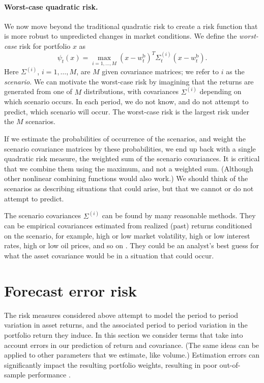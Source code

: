 \documentclass[openany]{now}
\newcommand{\wb}{w^\mathrm{b}}
\begin{document}
\paragraph{Worst-case quadratic risk.}
We now move beyond the traditional quadratic risk to create a
risk function that is more robust to unpredicted
changes in market conditions. We define the
\emph{worst-case} risk for portfolio $x$ as
\[
\psi_t(x) = \max_{i = 1, \ldots, M} (x-\wb_t)^T\Sigma^{(i)}_t (x-\wb_t).
\]
Here $\Sigma^{(i)}$, $i=1,\ldots, M$,
are $M$ given covariance matrices;
we refer to $i$ as the \emph{scenario}.
We can motivate the worst-case risk
by imagining that the returns are generated from one of $M$ distributions,
with covariances $\Sigma^{(i)}$ depending on which scenario occurs.
In each period, we do not know, and do not attempt to predict, which scenario
will occur.
The worst-case risk is the largest risk under the $M$ scenarios.

If we estimate the probabilities of occurrence of
the scenarios, and weight the scenario covariance matrices by these probabilities,
we end up back with a single quadratic risk measure,
the weighted sum of the scenario covariances.
It is critical that we combine them using the maximum, and not a
weighted sum. (Although other nonlinear combining functions would also work.)
We should think of the scenarios as describing situations that could arise,
but that we cannot or do not attempt to predict.

The scenario covariances $\Sigma^{(i)}$ can be found by many reasonable methods.
They can be empirical covariances estimated from realized (past) returns conditioned on the
scenario, for example, high or low market volatility, high or low interest rates,
high or low oil prices, and so on \cite{meucci2010historical}.
They could be an analyst's best guess for what the asset covariance would be
in a situation that could occur.


\section{Forecast error risk}
The risk measures considered above attempt to model the period to period
variation in asset returns, and the associated period to period variation in the
portfolio return they induce.
In this section we consider terms that take into account errors in
our prediction of return and covariance.
(The same ideas can be applied to other parameters that we estimate, like
volume.)
Estimation errors can significantly impact the resulting portfolio
weights, resulting in poor out-of-sample performance
\cite{jorion1985international,michaud1989markowitz,chopra1993effect,
kan2007optimal,demiguel2009optimal,fabozzi2010robust,kolm2014years}.
\end{document}
